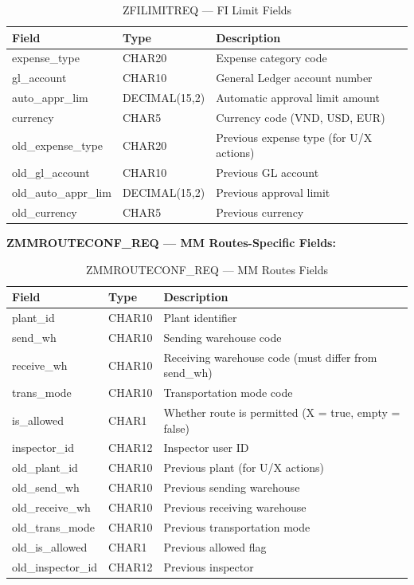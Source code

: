 \documentclass[12pt,a4paper]{report}
\begin{document}
\begin{table}[H]
\centering\small
\begin{tabularx}{\textwidth}{|l|l|X|}
  \hline
  \rowcolor{tableheadpeach}
  \textbf{Field} & \textbf{Type} & \textbf{Description} \\ \hline
  expense\_type & CHAR20 & Expense category code \\ \hline
  gl\_account & CHAR10 & General Ledger account number \\ \hline
  auto\_appr\_lim & DECIMAL(15,2) & Automatic approval limit amount \\ \hline
  currency & CHAR5 & Currency code (VND, USD, EUR) \\ \hline
  old\_expense\_type & CHAR20 & Previous expense type (for U/X actions) \\ \hline
  old\_gl\_account & CHAR10 & Previous GL account \\ \hline
  old\_auto\_appr\_lim & DECIMAL(15,2) & Previous approval limit \\ \hline
  old\_currency & CHAR5 & Previous currency \\ \hline
\end{tabularx}
\caption{ZFILIMITREQ --- FI Limit Fields}
\label{tab:fi-fields}
\end{table}

\noindent\textbf{ZMMROUTECONF\_REQ --- MM Routes-Specific Fields:}

\begin{table}[H]
\centering\small
\begin{tabularx}{\textwidth}{|l|l|X|}
  \hline
  \rowcolor{tableheadpeach}
  \textbf{Field} & \textbf{Type} & \textbf{Description} \\ \hline
  plant\_id & CHAR10 & Plant identifier \\ \hline
  send\_wh & CHAR10 & Sending warehouse code \\ \hline
  receive\_wh & CHAR10 & Receiving warehouse code (must differ from send\_wh) \\ \hline
  trans\_mode & CHAR10 & Transportation mode code \\ \hline
  is\_allowed & CHAR1 & Whether route is permitted (X = true, empty = false) \\ \hline
  inspector\_id & CHAR12 & Inspector user ID \\ \hline
  old\_plant\_id & CHAR10 & Previous plant (for U/X actions) \\ \hline
  old\_send\_wh & CHAR10 & Previous sending warehouse \\ \hline
  old\_receive\_wh & CHAR10 & Previous receiving warehouse \\ \hline
  old\_trans\_mode & CHAR10 & Previous transportation mode \\ \hline
  old\_is\_allowed & CHAR1 & Previous allowed flag \\ \hline
  old\_inspector\_id & CHAR12 & Previous inspector \\ \hline
\end{tabularx}
\caption{ZMMROUTECONF\_REQ --- MM Routes Fields}
\label{tab:mm-fields}
\end{table}
\end{document}
